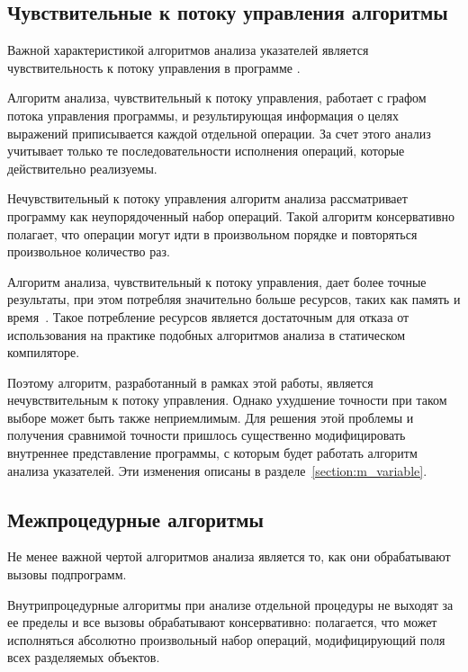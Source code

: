 \documentclass[14pt,titlepage,draft]{extarticle}
\begin{document}
    \subsection{Чувствительные к потоку управления алгоритмы}

      Важной характеристикой алгоритмов анализа указателей является
      чувствительность к потоку управления в программе
      .

      Алгоритм анализа, чувствительный к потоку управления, работает с графом
      потока управления программы, и результирующая информация о целях
      выражений приписывается каждой отдельной операции. За счет этого анализ
      учитывает только те последовательности исполнения операций, которые
      действительно реализуемы.

      Нечувствительный к потоку управления алгоритм анализа рассматривает
      программу как неупорядоченный набор операций. Такой алгоритм
      консервативно полагает, что операции могут идти в произвольном порядке и
      повторяться произвольное количество раз.

      Алгоритм анализа, чувствительный к потоку управления, дает более точные
      результаты, при этом потребляя значительно больше ресурсов, таких как
      память и время~\cite[раздел.~4.4]{hind_pointer_analysis_not_solved_yet}.
      Такое потребление ресурсов является достаточным для отказа от
      использования на практике подобных алгоритмов анализа в статическом
      компиляторе.

      Поэтому алгоритм, разработанный в рамках этой работы, является
      нечувствительным к потоку управления. Однако ухудшение точности при таком
      выборе может быть также неприемлимым.
      Для решения этой проблемы и получения сравнимой точности пришлось
      существенно модифицировать внутреннее представление программы, с которым
      будет работать алгоритм анализа указателей. Эти изменения описаны в
      разделе~\ref{section:m_variable}.

    \subsection{Межпроцедурные алгоритмы}

      Не менее важной чертой алгоритмов анализа является то, как они
      обрабатывают вызовы подпрограмм.

      Внутрипроцедурные алгоритмы при анализе отдельной процедуры не выходят за
      ее пределы и все вызовы обрабатывают консервативно: полагается, что может
      исполняться абсолютно произвольный набор операций, модифицирующий поля
      всех разделяемых объектов.
\end{document}
